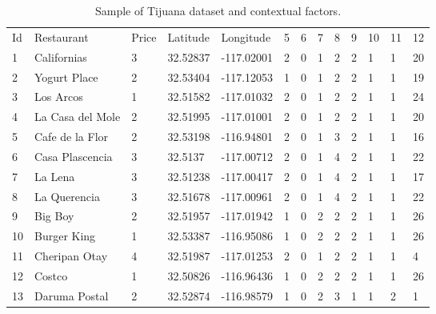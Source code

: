 \begin{table}
\small
\captionsetup{font=footnotesize}
\caption{Sample of Tijuana dataset and contextual factors.}
\label{tab:dataset} 
\centering
\begin{tabular}{lllllllllllll}
\hline\noalign{\smallskip}
Id &  Restaurant & Price & Latitude &  Longitude & 5 & 6 & 7 & 8 & 9 & 10 & 11 & 12   \\
\noalign{\smallskip}\hline\noalign{\smallskip}
1   &   Californias &   3   &   32.52837    &   -117.02001  &   2   &   0   &   1   &   2   &   2   &   1   &   1   &   20  \\
2   &   Yogurt Place    &   2   &   32.53404    &   -117.12053  &   1   &   0   &   1   &   2   &   2   &   1   &   1   &   19  \\
3   &   Los Arcos   &   1   &   32.51582    &   -117.01032  &   2   &   0   &   1   &   2   &   2   &   1   &   1   &   24  \\
4   &   La Casa del Mole &   2   &   32.51995    &   -117.01001  &   2   &   0   &   1   &   2   &   2   &   1   &   1   &   20  \\
5   &   Cafe de la Flor     &   2   &   32.53198    &   -116.94801  &   2   &   0   &   1   &   3   &   2   &   1   &   1   &   16  \\
6   &   Casa Plascencia &   3   &   32.5137 &   -117.00712  &   2   &   0   &   1   &   4   &   2   &   1   &   1   &   22  \\
7   &   La Lena &   3   &   32.51238    &   -117.00417  &   2   &   0   &   1   &   4   &   2   &   1   &   1   &   17  \\
8   &   La Querencia    &   3   &   32.51678    &   -117.00961  &   2   &   0   &   1   &   4   &   2   &   1   &   1   &   22  \\
9   &   Big Boy &   2   &   32.51957    &   -117.01942  &   1   &   0   &   2   &   2   &   2   &   1   &   1   &   26  \\
10  &   Burger King &   1   &   32.53387    &   -116.95086  &   1   &   0   &   2   &   2   &   2   &   1   &   1   &   26  \\
11  &   Cheripan Otay   &   4   &   32.51987    &   -117.01253  &   2   &   0   &   1   &   2   &   2   &   1   &   1   &   4   \\
12  &   Costco  &   1   &   32.50826    &   -116.96436  &   1   &   0   &   2   &   2   &   2   &   1   &   1   &   26  \\
13  &   Daruma Postal   &   2   &   32.52874    &   -116.98579  &   1   &   0   &   2   &   3   &   1   &   1   &   2   &   1   \\

\end{tabular}
\end{table}
